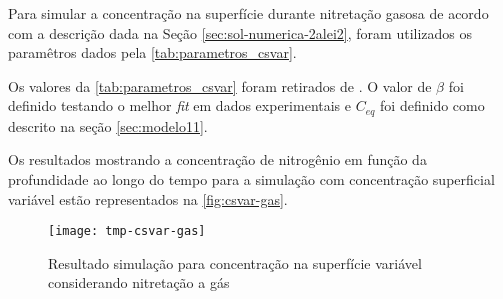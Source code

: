 
Para simular a concentração na superfície durante nitretação gasosa de acordo com a descrição dada na Seção \autoref{sec:sol-numerica-2alei2}, foram utilizados os paramêtros dados pela \autoref{tab:parametros_csvar}.

\begin{table}[ht]
\centering
\setlength{\doublerulesep}{\arrayrulewidth}
{\def\arraystretch{2}\tabcolsep=10pt
\caption{Parâmetros para concentração na superfície variável nitretação gasosa}
}
\end{table}

Os valores da \autoref{tab:parametros_csvar} foram retirados de \cite{christiansen2008nitrogen}. O valor de $\beta$ foi definido testando o melhor \textit{fit} em dados experimentais e $C_{eq}$ foi definido como descrito na seção \autoref{sec:modelo11}.

Os resultados mostrando a concentração de nitrogênio em função da profundidade ao longo do tempo para a simulação com concentração superficial variável estão representados na \autoref{fig:csvar-gas}.

\begin{figure}[ht]
\centering
	\caption{Resultado simulação para concentração na superfície variável considerando nitretação a gás}
	\texttt{[image: tmp-csvar-gas]}
	\label{fig:csvar-gas}
	\centering
\end{figure}